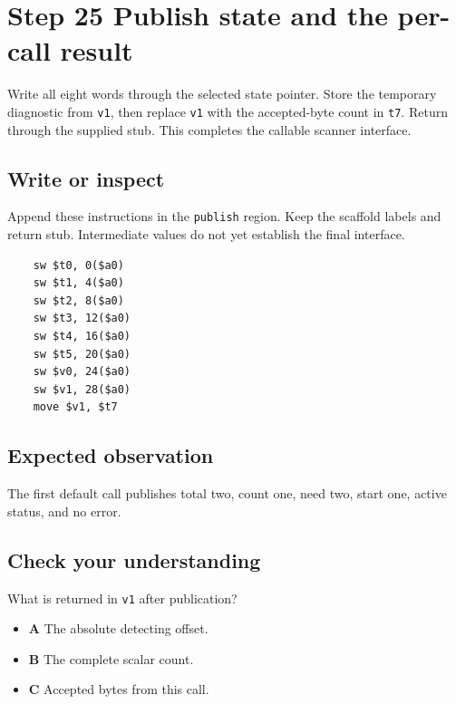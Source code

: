 \section{Step 25 Publish state and the per-call result}\label{utf8-s25}

Write all eight words through the selected state pointer. Store the temporary diagnostic from \texttt{v1}, then replace \texttt{v1} with the accepted-byte count in \texttt{t7}. Return through the supplied stub. This completes the callable scanner interface.

\subsection{Write or inspect}
Append these instructions in the \texttt{publish} region. Keep the scaffold labels and return stub. Intermediate values do not yet establish the final interface.

\begin{verbatim}
    sw $t0, 0($a0)
    sw $t1, 4($a0)
    sw $t2, 8($a0)
    sw $t3, 12($a0)
    sw $t4, 16($a0)
    sw $t5, 20($a0)
    sw $v0, 24($a0)
    sw $v1, 28($a0)
    move $v1, $t7
\end{verbatim}

\subsection{Expected observation}
The first default call publishes total two, count one, need two, start one, active status, and no error.

\subsection{Check your understanding}
What is returned in \texttt{v1} after publication?

\begin{itemize}
  \item \textbf{A} The absolute detecting offset.
  \item \textbf{B} The complete scalar count.
  \item \textbf{C} Accepted bytes from this call.
\end{itemize}
